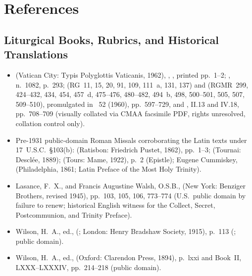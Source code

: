 \section{References}

\subsection*{Liturgical Books, Rubrics, and Historical Translations}
\begin{itemize}
\item {} (Vatican City: Typis Polyglottis Vaticanis, 1962), , , printed pp.~1--2; , n.~1082, p.~293;  (RG~11, 15, 20, 91, 109, 111~a, 131, 137) and  (RGMR~299, 424--432, 434, 454, 457~d, 475--476, 480--482, 494~b, 498, 500--501, 505, 507, 509--510), promulgated in ~52 (1960), pp.~597--729, and , II.13 and IV.18, pp.~708--709 (visually collated via CMAA facsimile PDF, rights unresolved, collation control only).
\item Pre-1931 public-domain Roman Missals corroborating the Latin texts under 17~U.S.C.~\S103(b):  (Ratisbon: Friedrich Pustet, 1862), pp.~1--3;  (Tournai: Descl\'ee, 1889);  (Tours: Mame, 1922), p.~2 (Epistle); Eugene Cummiskey,  (Philadelphia, 1861; Latin Preface of the Most Holy Trinity).
\item Lasance, F.~X., and Francis Augustine Walsh, O.S.B.,  (New York: Benziger Brothers, revised 1945), pp.~103, 105, 106, 773--774 (U.S.~public domain by failure to renew; historical English witness for the Collect, Secret, Postcommunion, and Trinity Preface).
\item Wilson, H.~A., ed.,  (; London: Henry Bradshaw Society, 1915), p.~113 (; public domain).
\item Wilson, H.~A., ed.,  (Oxford: Clarendon Press, 1894), p.~lxxi and Book~II, LXXX--LXXXIV, pp.~214--218 (public domain).
\end{itemize}

